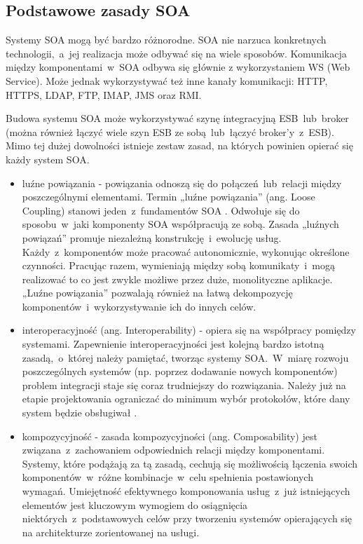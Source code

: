 \subsection{Podstawowe zasady SOA}
Systemy SOA mogą być bardzo różnorodne. SOA nie narzuca konkretnych technologii,~a~jej realizacja może odbywać się na wiele sposobów. Komunikacja między komponentami~w~SOA odbywa się głównie z wykorzystaniem WS (Web Service). Może jednak wykorzystywać też inne kanały komunikacji: HTTP, HTTPS, LDAP, FTP, IMAP, JMS oraz RMI. 

Budowa systemu SOA może wykorzystywać szynę integracyjną ESB~lub~broker (można również łączyć wiele szyn ESB ze sobą~lub~łączyć broker’y~z~ESB). Mimo tej dużej dowolności istnieje zestaw zasad, na których powinien opierać się każdy system SOA.
\begin{itemize}
\item{luźne powiązania - powiązania odnoszą się do połączeń~lub~relacji między poszczególnymi elementami. Termin „luźne powiązania” (ang. Loose Coupling) stanowi jeden~z~fundamentów SOA \cite{SOAsdj102009}. Odwołuje się do sposobu~w~jaki komponenty SOA współpracują ze sobą.  Zasada „luźnych powiązań” promuje niezależną konstrukcję~i~ewolucję usług. Każdy~z~komponentów może pracować autonomicznie, wykonując określone czynności. Pracując razem, wymieniają między sobą komunikaty~i~mogą realizować to co jest zwykle możliwe przez duże, monolityczne aplikacje. „Luźne powiązania” pozwalają również na łatwą dekompozycję komponentów~i~wykorzystywanie ich do innych celów.}
\item{interoperacyjność (ang. Interoperability) - opiera się na współpracy pomiędzy systemami. Zapewnienie interoperacyjności jest kolejną bardzo istotną zasadą,~o~której należy pamiętać, tworząc systemy SOA.~W~miarę rozwoju poszczególnych systemów (np. poprzez dodawanie nowych komponentów) problem integracji staje się coraz trudniejszy do rozwiązania. Należy już na etapie projektowania ograniczać do minimum wybór protokołów, które dany system będzie obsługiwał \cite{SOAsdj102009}.}
\item{kompozycyjność - zasada kompozycyjności (ang. Composability) jest związana~z~zachowaniem odpowiednich relacji między komponentami. Systemy, które podążają za tą zasadą, cechują się możliwością łączenia swoich komponentów~w~różne kombinacje~w~celu spełnienia postawionych wymagań. Umiejętność efektywnego komponowania usług~z~już istniejących elementów jest kluczowym wymogiem do osiągnięcia niektórych~z~podstawowych celów przy tworzeniu systemów opierających się na architekturze zorientowanej na usługi.}

\end{itemize}
